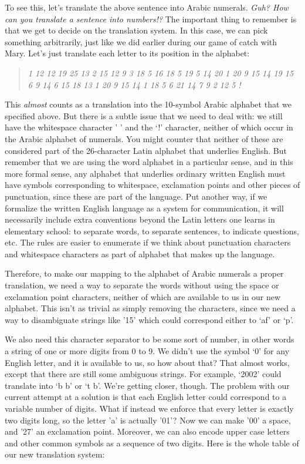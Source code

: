 \documentclass[UTF8]{book}
\begin{document}
\begin{CJK}{UTF8}{gbsn}
To see this, let's translate the above sentence into Arabic numerals. \emph{Guh? How can you translate a sentence into numbers!?} The important thing to remember is that we get to decide on the translation system. In this case, we can pick something arbitrarily, just like we did earlier during our game of catch with Mary. Let's just translate each letter to its position in the alphabet:

\begin{quotation}
\centering
\emph{1 12 12  19 25 13 2 15 12 9 3  18 5 16 18 5 19 5 14 20 1 20 9 15 14 19  15 6  9 14 6 15 18 13 1 20 9 15 14  1 18 5  6 21 14 7 9 2 12 5 !}
\end{quotation}

This \emph{almost} counts as a translation into the 10-symbol Arabic alphabet that we specified above. But there is a subtle issue that we need to deal with: we still have the whitespace character ' ' and the `!' character, neither of which occur in the Arabic alphabet of numerals. You might counter that neither of these are considered part of the 26-character Latin alphabet that underlies English. But remember that we are using the word alphabet in a particular sense, and in this more formal sense, any alphabet that underlies ordinary written English must have symbols corresponding to whitespace, exclamation points and other pieces of punctuation, since these are part of the language. Put another way, if we formalize the written English language as a system for communication, it will necessarily include extra conventions beyond the Latin letters one learns in elementary school: to separate words, to separate sentences, to indicate questions, etc. The rules are easier to enumerate if we think about punctuation characters and whitespace characters as part of alphabet that makes up the language.

Therefore, to make our mapping to the alphabet of Arabic numerals a proper translation, we need a way to separate the words without using the space or exclamation point characters, neither of which are available to us in our new alphabet. This isn't as trivial as simply removing the characters, since we need a way to disambiguate strings like '15' which could correspond either to `af' or `p'.

We also need this character separator to be some sort of number, in other words a string of one or more digits from 0 to 9. We didn't use the symbol `0' for any English letter, and it is available to us, so how about that? That almost works, except that there are still some ambiguous strings. For example, `2002' could translate into `b  b' or `t b'. We're getting closer, though. The problem with our current attempt at a solution is that each English letter could correspond to a variable number of digits. What if instead we enforce that every letter is exactly two digits long, so the letter 'a' is actually '01'? Now we can make '00' a space, and '27' an exclamation point. Moreover, we can also encode upper case letters and other common symbols as a sequence of two digits. Here is the whole table of our new translation system:


\end{CJK}
\end{document}
